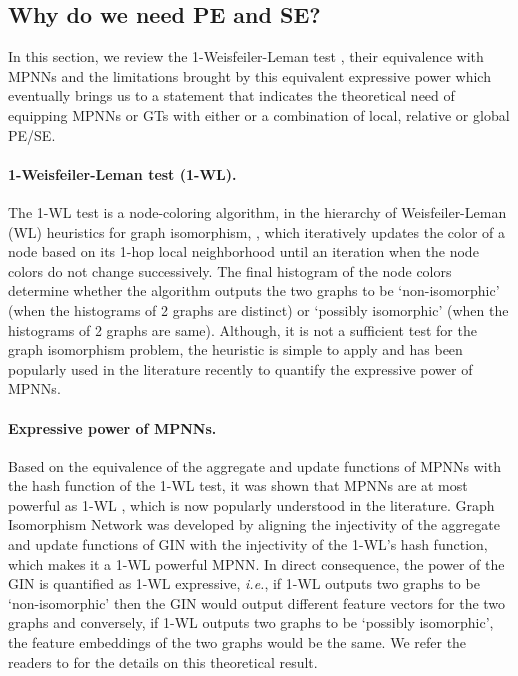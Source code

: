 \documentclass{article}
\begin{document}
\subsection{Why do we need PE and SE?}
\label{app:WL}

In this section, we review the 1-Weisfeiler-Leman test \cite{weisfeiler1968reduction}, their equivalence with MPNNs and the limitations brought by this equivalent expressive power which eventually brings us to a statement that indicates the theoretical need of equipping MPNNs or GTs with either or a combination of local, relative or global PE/SE.


\paragraph{1-Weisfeiler-Leman test (1-WL).}
The 1-WL test is a node-coloring algorithm, in the hierarchy of Weisfeiler-Leman (WL) heuristics for graph isomorphism, \cite{weisfeiler1968reduction}, which iteratively updates the color of a node based on its 1-hop local neighborhood until an iteration when the node colors do not change successively. The final histogram of the node colors determine whether the algorithm outputs the two graphs to be `non-isomorphic' (when the histograms of 2 graphs are distinct) or `possibly isomorphic' (when the histograms of 2 graphs are same). Although, it is not a sufficient test for the graph isomorphism problem, the heuristic is simple to apply and has been popularly used in the literature recently to quantify the expressive power of MPNNs.


\paragraph{Expressive power of MPNNs.} Based on the equivalence of the aggregate and update functions of MPNNs with the hash function of the 1-WL test, it was shown that MPNNs are at most powerful as 1-WL \cite{xu2018how, morris2019}, which is now popularly understood in the literature. Graph Isomorphism Network \cite{xu2018how} was developed by aligning the injectivity of the aggregate and update functions of GIN with the injectivity of the 1-WL's hash function, which makes it a 1-WL powerful MPNN. In direct consequence, the power of the GIN is quantified as 1-WL expressive, \textit{i.e.}, if 1-WL outputs two graphs to be `non-isomorphic' then the GIN would output different feature vectors for the two graphs and conversely, if 1-WL outputs two graphs to be `possibly isomorphic', the feature embeddings of the two graphs would be the same. We refer the readers to \cite{xu2018how} for the details on this theoretical result.
\end{document}
